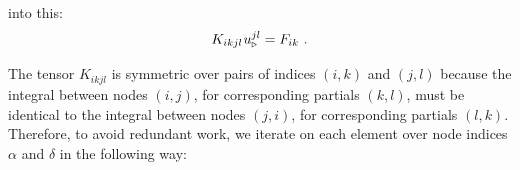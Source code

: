    into this:
   \begin{equation*}
      K_{i k j l} \mkern1mu u^{j l}_\triangleright
      =
      F_{i k} \ .
   \end{equation*}

   The tensor $K_{ikjl}$ is symmetric over pairs of indices $(i,k)$ and $(j,l)$ because the integral between nodes $(i,j)$, for corresponding partials $(k,l)$, must be identical to the integral between nodes $(j,i)$, for corresponding partials $(l,k)$. Therefore, to avoid redundant work, we iterate on each element over node indices $\alpha$ and $\delta$ in the following way:

